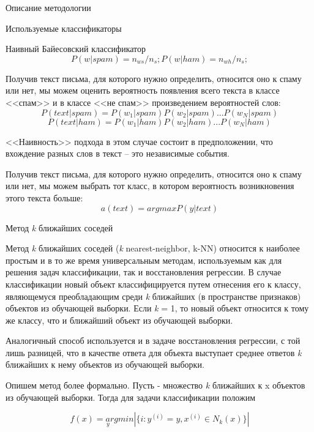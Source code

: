 \begin{section}{Описание методологии}
\begin{subsection}{Используемые классификаторы}
\begin{subsubsection}{Наивный Байесовский классификатор}
\begin{equation}
  P(w|spam) = n_{ws}/n_s; P(w|ham) = n_{wh}/n_s;
\end{equation}

Получив текст письма, для которого нужно определить, относится оно к спаму или нет, мы можем оценить вероятность появления всего текста в классе <<спам>> и в классе <<не спам>> произведением вероятностей слов:
\begin{equation}
P(text|spam) = P(w_1|spam)P(w_2|spam)...P(w_N|spam)
\end{equation}
\begin{equation}
P(text|ham) = P(w_1|ham)P(w_2|ham)...P(w_N|ham)
\end{equation}

<<Наивность>> подхода в этом случае состоит в предположении, что вхождение разных слов в текст – это независимые события.

Получив текст письма, для которого нужно определить, относится оно к спаму или нет, мы можем выбрать тот класс, в котором вероятность возникновения этого текста больше:
\begin{equation}
a(text) = argmaxP(y|text)
\end{equation}
\end{subsubsection}

    \begin{subsubsection}{Метод \textit{k} ближайших соседей}

      Метод \textit{k} ближайших соседей (\textit{k} nearest-neighbor, k-NN) относится к наиболее простым и в то же время универсальным методам, используемым как для решения задач классификации, так и восстановления регрессии. В случае классификации новый объект классифицируется путем отнесения его к классу, являющемуся преобладающим среди \textit{k} ближайших (в пространстве признаков) объектов из обучающей выборки. Если \textit{k} = 1, то новый объект относится к тому же классу, что и ближайший объект из обучающей выборки.

      Аналогичный способ используется и в задаче восстановления регрессии, с той лишь разницей, что в качестве ответа для объекта выступает среднее ответов \textit{k} ближайших к нему объектов из обучающей выборки.

      Опишем метод более формально. Пусть  - множество \textit{k} ближайших к x объектов из обучающей выборки. Тогда для задачи классификации положим

      \begin{equation}
        f(x)=\underset{y}arg⁡min⁡|\{i\colon y^{(i)}=y, x^{(i)} \in N_k (x)\}|
      \end{equation}


\end{subsubsection}
\end{subsection}
\end{section}
